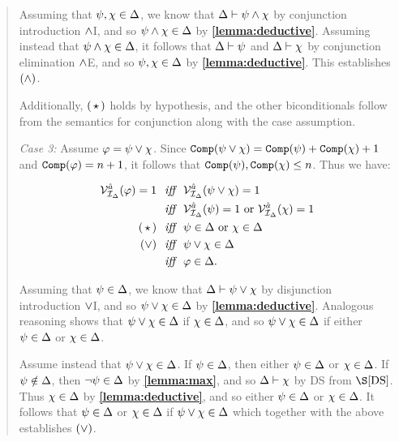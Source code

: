 \begin{quote}
  Assuming that $\psi,\chi\in\Delta$, we know that $\Delta\vdash\psi\wedge\chi$ by conjunction introduction $\wedge$I, and so $\psi\wedge\chi\in\Delta$ by \textbf{\ref{lemma:deductive}}.
  Assuming instead that $\psi\wedge\chi\in\Delta$, it follows that $\Delta\vdash\psi$ and $\Delta\vdash\chi$ by conjunction elimination $\wedge$E, and so $\psi,\chi\in\Delta$ by \textbf{\ref{lemma:deductive}}.
  This establishes $(\wedge)$.

  Additionally, $(\hspace{1.6pt}\star\hspace{1.6pt})$ holds by hypothesis, and the other biconditionals follow from the semantics for conjunction along with the case assumption.


  \textit{Case 3:}
  Assume $\varphi=\psi\vee\chi$.
  Since $\texttt{Comp}(\psi\vee\chi)=\texttt{Comp}(\psi)+\texttt{Comp}(\chi)+1$ and  $\texttt{Comp}(\varphi)=n+1$, it follows that $\texttt{Comp}(\psi),\texttt{Comp}(\chi)\leq n$.
  Thus we have:

  \vspace{-.2in}
  \begin{align*}
    \mathcal{V}_{\mathcal{I}_{\Delta}}^{\hat{a}}(\varphi)=1 &\textit{ ~iff~ } \mathcal{V}_{\mathcal{I}_{\Delta}}^{\hat{a}}(\psi\vee\chi)=1\\
      &\textit{ ~iff~ } \mathcal{V}_{\mathcal{I}_{\Delta}}^{\hat{a}}(\psi)=1 \text{ or } \mathcal{V}_{\mathcal{I}_{\Delta}}^{\hat{a}}(\chi)=1 \\
      (\hspace{1.6pt}\star\hspace{1.6pt}) &\textit{ ~iff~ } \psi\in\Delta \text{ or } \chi\in\Delta \\
      (\vee) &\textit{ ~iff~ } \psi\vee\chi\in\Delta \\
      &\textit{ ~iff~ } \varphi\in\Delta.
  \end{align*}

  Assuming that $\psi\in\Delta$, we know that $\Delta\vdash\psi\vee\chi$ by disjunction introduction $\vee$I, and so $\psi\vee\chi\in\Delta$ by \textbf{\ref{lemma:deductive}}.
  Analogous reasoning shows that $\psi\vee\chi\in\Delta$ if $\chi\in\Delta$, and so $\psi\vee\chi\in\Delta$ if either $\psi\in\Delta$ or $\chi\in\Delta$. 

  Assume instead that $\psi\vee\chi\in\Delta$.
  If $\psi\in\Delta$, then either $\psi\in\Delta$ or $\chi\in\Delta$.
  If $\psi\notin\Delta$, then $\neg\psi\in\Delta$ by \textbf{\ref{lemma:max}}, and so $\Delta\vdash\chi$ by DS from $\S\ref{DS}$.
  Thus $\chi\in\Delta$ by \textbf{\ref{lemma:deductive}}, and so either $\psi\in\Delta$ or $\chi\in\Delta$. 
  It follows that $\psi\in\Delta$ or $\chi\in\Delta$ if $\psi\vee\chi\in\Delta$ which together with the above establishes $(\vee)$.  


\end{quote}
